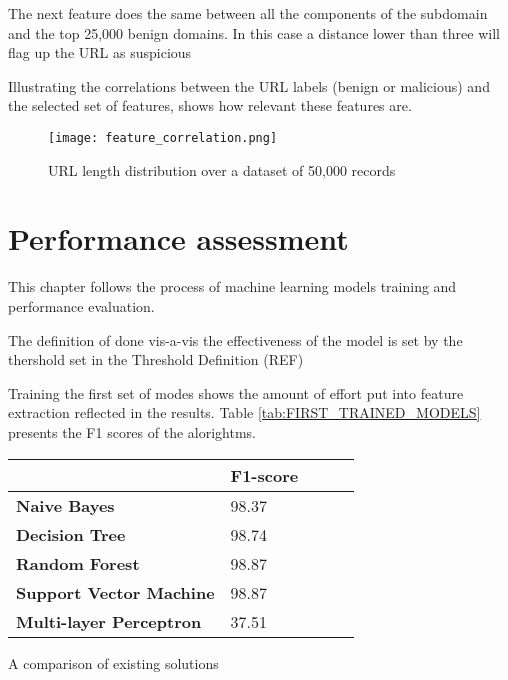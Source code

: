 The next feature does the same between all the components of the subdomain and the top 25,000 benign domains. In this case a distance lower than three will flag up the URL as suspicious

Illustrating the correlations between the URL labels (benign or malicious) and the selected set of features, shows how relevant these features are.

\begin{figure}[t]
	\centering
	\texttt{[image: feature\_correlation.png]}
	\caption{URL length distribution over a dataset of 50,000 records}
	\label{fig:FEATURE_CORRELATION}
\end{figure}

\section{Performance assessment}
This chapter follows the process of machine learning models training and performance evaluation.



The definition of done vis-a-vis the effectiveness of the model is set by the thershold set in the Threshold Definition (REF)


Training the first set of modes shows the amount of effort put into feature extraction reflected in the results. Table \ref{tab:FIRST_TRAINED_MODELS} presents the F1 scores of the alorightms. 

\begin{singlespace}
	\small
	\begin{center}
		\label{tab:FIRST_TRAINED_MODELS}
		\begin{tabular}{ | m{8em} | m{13em} | m{8.5em} | m{2.3em} | m{5em} | }
			\hline
			                                & \textbf{F1-score} \\
			\hline
			\textbf{Naive Bayes}            & 98.37             \\
			\hline
			\textbf{Decision Tree}          & 98.74             \\
			\hline
			\textbf{Random Forest}          & 98.87             \\
			\hline
			\textbf{Support Vector Machine} & 98.87             \\
			\hline
			\textbf{Multi-layer Perceptron} & 37.51             \\
			\hline
		\end{tabular}
		\captionsetup{type=table}\caption{A comparison of existing solutions \citep{INTELLIGENT_PHISHING_ANFIS}}
	\end{center}
\end{singlespace}

